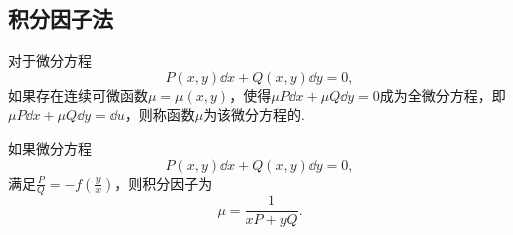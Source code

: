\subsection{积分因子法}
对于微分方程\[
P(x,y)\dd{x} + Q(x,y)\dd{y} = 0,
\]如果存在连续可微函数\(\mu=\mu(x,y)\)，使得\(\mu P \dd{x} + \mu Q \dd{y} = 0\)成为全微分方程，即\(\mu P \dd{x} + \mu Q \dd{y} = \dd{u}\)，则称函数\(\mu\)为该微分方程的.

如果微分方程\[
P(x,y)\dd{x} + Q(x,y)\dd{y} = 0,
\]满足\(\frac{P}{Q}=-f\left(\frac{y}{x}\right)\)，则积分因子为\[
\mu = \frac{1}{xP+yQ}.
\]
